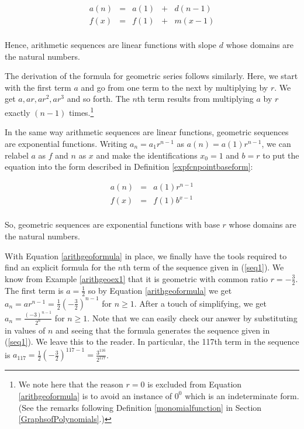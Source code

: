 \[ \begin{array}{ccccc}
a(n) & = & a(1) & + & d (n-1) \\
 f(x) & = & f(1) & + & m (x-1) \\ \end{array} \]


Hence,  arithmetic sequences are linear functions with slope $d$ whose domains are the natural numbers.


The derivation of the formula for geometric series follows similarly.  Here, we start with the first term $a$ and go from one term to the next by multiplying by $r$.  We get $a, ar, ar^2, ar^3$ and so forth.  The $n$th term results from multiplying $a$ by $r$ exactly $(n-1)$ times.\footnote{We note here that the reason $r=0$ is excluded from Equation \ref{arithgeoformula} is to avoid an instance of $0^{0}$ which is an indeterminate form. (See the remarks following Definition \ref{monomialfunction} in Section \ref{GraphsofPolynomials}.)} 

In the same way  arithmetic sequences are linear functions, geometric sequences are exponential functions.  Writing  $a_{n} = a_{1} r^{n-1}$ as $a(n) = a(1) r^{n-1}$,  we can relabel $a$ as $f$ and $n$ as $x$ and make the identifications $x_{0} = 1$ and $b = r$ to put the equation into the form described in  Definition \ref{expfcnpointbaseform}:

\[ \begin{array}{ccc}
a(n) & = & a(1) r^{n-1} \\
 f(x) & = & f(1) b^{x-1} \\ \end{array} \]

So, geometric sequences are exponential functions with base $r$ whose domains are the natural numbers.

With Equation \ref{arithgeoformula} in place, we finally have the tools required to find an explicit formula for the $n$th term of the sequence given in (\ref{seq1}). We know from Example \ref{arithgeoex1} that it is geometric with common ratio $r = -\frac{3}{2}$.  The first term is $a = \frac{1}{2}$ so by Equation \ref{arithgeoformula} we get $a_{n} = ar^{n-1} = \frac{1}{2} \left( - \frac{3}{2}\right)^{n-1}$ for $n \geq 1$.  After a touch of simplifying, we get $a_{n} = \frac{(-3)^{n-1}}{2^{n}}$ for $n \geq 1$. Note that we can easily check our answer by substituting in values of $n$ and seeing that the formula generates the sequence given in (\ref{seq1}).  We leave this to the reader.  In particular, the 117th term in the sequence is $a_{117} = \frac{1}{2} \left(-\frac{3}{2} \right)^{117-1} = \frac{3^{116}}{2^{117}}$.


